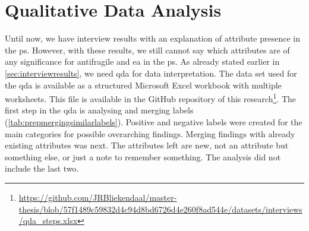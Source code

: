 \section{Qualitative Data Analysis}
\label{sec:dataprep}
Until now, we have interview results with an explanation of attribute presence in the \gls{ps}. However, with these results, we still cannot say which attributes are of any significance for \gls{antifragile} and \acrshort{ea} in the \gls{ps}. As already stated earlier in \cref{sec:interviewresults}, we need \acrshort{qda} for data interpretation. The data set used for the \acrshort{qda} is available as a structured Microsoft Excel workbook with multiple worksheets. This file is available in the GitHub repository of this research\footnote{\url{https://github.com/JRBliekendaal/master-thesis/blob/57f1489c59832d4c94d8bd6726d4e260f8ad544e/datasets/interviews/qda_steps.xlsx}}. The first step in the \acrshort{qda} is analysing and merging labels (\cref{tab:prepmergingsimilarlabels}). Positive and negative labels were created for the main categories for possible overarching findings. Merging findings with already existing \glspl{attribute} was next. The \glspl{attribute} left are new, not an \gls{attribute} but something else, or just a note to remember something. The analysis did not include the last two. 
